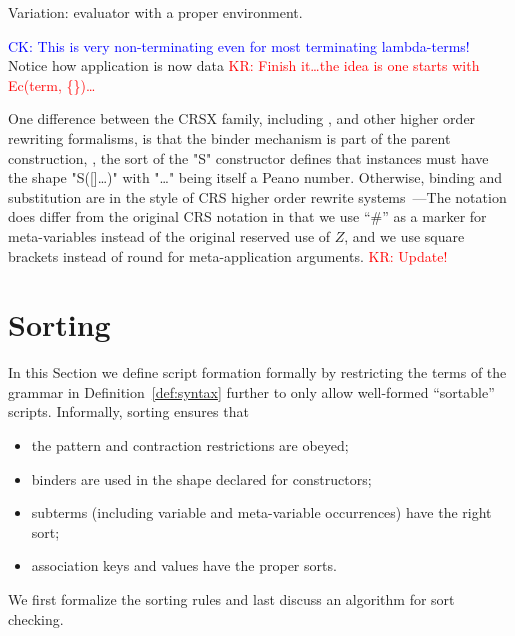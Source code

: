 \documentclass[letterpaper,11pt]{article}
\newcommand{\CK}[1]{\textcolor{blue}{CK: #1}}
\newcommand{\KR}[1]{\textcolor{red}{KR: #1}}
\begin{document}
\begin{example}
  Variation: evaluator with a proper environment. 
  \CK{This is very non-terminating even for most terminating lambda-terms!}
  Notice how application is now data
  \KR{Finish it…the idea is one starts with Ec(term, \{\})…}
\end{example}

\begin{remark}
  One difference between the CRSX family, including \hax, and other higher order rewriting
  formalisms, is that the binder mechanism is part of the parent construction, \eg, the sort of the
  "S" constructor defines that instances must have the shape "S([]…)" with "…" being itself a Peano
  number.  Otherwise, binding and substitution are in the style of CRS higher order rewrite
  systems~\cite{Klop+:tcs1993}---The notation does differ from the original CRS notation in that we
  use ``\#'' as a marker for meta-variables instead of the original reserved use of $Z$, and we use
  square brackets instead of round for meta-application arguments. \KR{Update!}
\end{remark}



\section{Sorting}
\label{sec:sorting}

In this Section we define \hax script formation formally by restricting the terms of the grammar in
Definition~\ref{def:syntax} further to only allow well-formed ``sortable'' scripts. Informally,
sorting ensures that
\begin{itemize}
\item the pattern and contraction restrictions are obeyed;
\item binders are used in the shape declared for constructors;
\item subterms (including variable and meta-variable occurrences) have the right sort;
\item association keys and values have the proper sorts.
\end{itemize}
We first formalize the sorting rules and last discuss an algorithm for sort checking.
\end{document}
